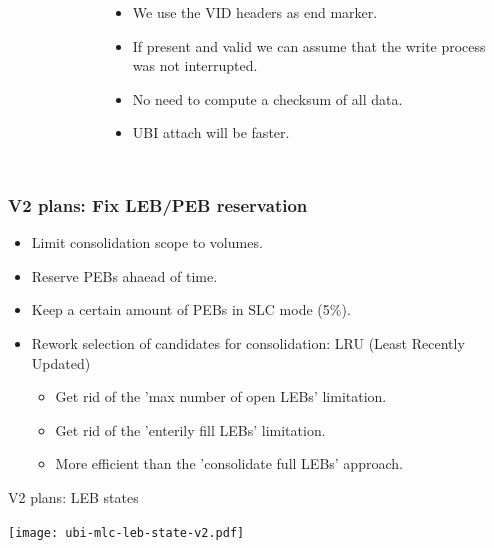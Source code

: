 \documentclass[aspectratio=169,obeyspaces,spaces,hyphens,dvipsnames]{beamer}
\begin{document}
\begin{frame}[fragile]
\begin{columns}
\begin{figure}
     \end{figure}
    \begin{itemize}
    \item We use the VID headers as end marker.
    \item If present and valid we can assume that the write process was not interrupted.
    \item No need to compute a checksum of all data.
    \item UBI attach will be faster.
    \end{itemize}
   \end{columns}
\end{frame}

\begin{frame}[fragile]
\frametitle{V2 plans: Fix LEB/PEB reservation}
  \begin{itemize}
  \item Limit consolidation scope to volumes.
  \item Reserve PEBs ahaead of time.
  \item Keep a certain amount of PEBs in SLC mode (5\%).
  \item Rework selection of candidates for consolidation: LRU (Least
	Recently Updated)
    \begin{itemize}
    \item Get rid of the 'max number of open LEBs' limitation.
    \item Get rid of the 'enterily fill LEBs' limitation.
    \item More efficient than the 'consolidate full LEBs' approach.
    \end{itemize}
  \end{itemize}
\end{frame}

\begin{frame}{V2 plans: LEB states}
  \begin{center}
    \texttt{[image: ubi-mlc-leb-state-v2.pdf]}
  \end{center}
\end{frame}
\end{document}
